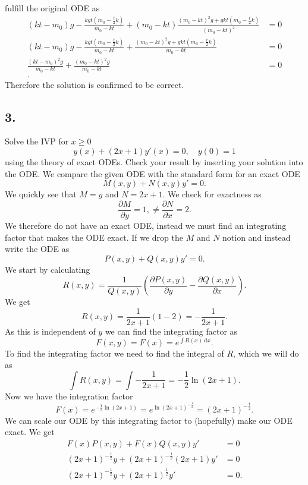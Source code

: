 fulfill the original ODE as
\begin{align*}
  \left( kt - m_0 \right)g - \frac{kgt \left( m_0 - \frac{t}{2}k \right)}{m_0 - kt} + \left( m_0 - kt \right) \frac{\left( m_0 - kt \right)^2g + gkt \left( m_0 - \frac{t}{2}k \right)}{\left( m_0 - kt \right)^2} &= 0 \\
  \left( kt - m_0 \right)g - \frac{kgt \left( m_0 - \frac{t}{2}k \right)}{m_0 - kt} + \frac{\left( m_0 - kt \right)^2g + gkt \left( m_0 - \frac{t}{2}k \right)}{m_0 - kt} &= 0 \\
  \frac{\left( kt - m_0 \right)^2g}{m_0 - kt} + \frac{\left( m_0 - kt \right)^2g}{m_0 - kt} &= 0 \\
.\end{align*}
Therefore the solution is confirmed to be correct.


\subsection*{3.} Solve the IVP for $x \geq 0$
\[ 
y(x) + \left( 2x+1 \right)y'(x) = 0, \quad y(0) = 1
\]
using the theory of exact ODEs. Check your result by inserting your solution into the ODE.
\bigbreak
We compare the given ODE with the standard form for an exact ODE
\[ 
M(x, y) + N(x,y)y' = 0
.\]
We quickly see that $M = y$ and $N = 2x + 1$. We check for exactness as
\[ 
\frac{\partial M}{\partial y} = 1, \neq  \frac{\partial N}{\partial x} = 2
.\]
We therefore do not have an exact ODE, instead we must find an integrating factor that makes the ODE exact. If we drop the $M$ and $N$ notion and instead write the ODE as
\[ 
P(x,y) + Q(x,y) y' = 0
.\]
We start by calculating
\[ 
R(x,y) = \frac{1}{Q(x,y)} \left( \frac{\partial P(x,y)}{\partial y} - \frac{\partial Q(x,y)}{\partial x} \right)
.\]
We get
\[ 
R(x,y) = \frac{1}{2x+1} \left( 1 - 2 \right) = - \frac{1}{2x+1}
.\]
As this is independent of $y$ we can find the integrating factor as
\[ 
F(x,y) = F(x) = e^{\int R(x) \, \mathrm{d}x}
.\]
To find the integrating factor we need to find the integral of $R$, which we will do as
\[ 
\int R(x,y) = \int - \frac{1}{2x+1} = -\frac{1}{2} \ln (2x+1)
.\]
Now we have the integration factor
\[ 
F(x) = e^{-\frac{1}{2} \ln(2x+1)} = e^{\ln(2x+1)^{-\frac{1}{2}}} = (2x+1)^{-\frac{1}{2}}
.\]
We can scale our ODE by this integrating factor to (hopefully) make our ODE exact. We get
\begin{align*}
  F(x) P(x,y) + F(x)Q(x,y)y' &= 0 \\
  (2x+1)^{-\frac{1}{2}} y + (2x+1)^{-\frac{1}{2}} (2x+1) y' &= 0 \\
  (2x+1)^{-\frac{1}{2}}y + (2x+1)^{\frac{1}{2}}y' &= 0
.\end{align*} 
